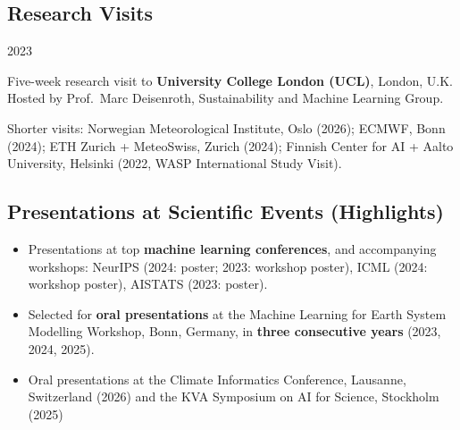 \documentclass[11pt]{article}
\begin{document}
\subsection*{Research Visits}
\begin{labeling}{2023\quad}
\item [2023] Five-week research visit to \textbf{University College London (UCL)}, London, U.K.\\
        {\footnotesize Hosted by Prof.\ Marc Deisenroth, Sustainability and Machine Learning Group.}
\end{labeling}
\vspace{-1em}
{\footnotesize
Shorter visits:
Norwegian Meteorological Institute, Oslo (2026);
ECMWF, Bonn (2024);
ETH Zurich + MeteoSwiss, Zurich (2024);
Finnish Center for AI + Aalto University, Helsinki (2022, WASP International Study Visit).
}

\subsection*{Presentations at Scientific Events (Highlights)}
\begin{itemize}
    \item Presentations at top \textbf{machine learning conferences}, and accompanying workshops:
        NeurIPS (2024: poster; 2023: workshop poster),
        ICML (2024: workshop poster),
        AISTATS (2023: poster).
    \item Selected for \textbf{oral presentations} at the Machine Learning for Earth System Modelling Workshop, Bonn, Germany, in \textbf{three consecutive years} (2023, 2024, 2025).
    \item Oral presentations at the Climate Informatics Conference, Lausanne, Switzerland (2026) and the KVA Symposium on AI for Science, Stockholm (2025)
\end{itemize}

\end{document}
